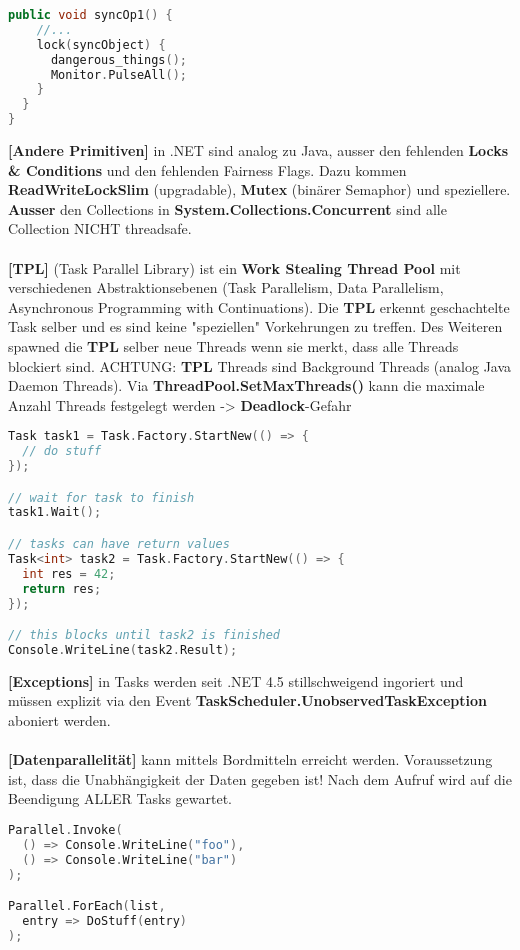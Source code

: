\documentclass[8pt]{extarticle}
\let\oldtextbf\textbf
\renewcommand{\textbf}{\tiny\oldtextbf}
\begin{document}
\begin{multicols*}{5}
\begin{lstlisting}[language=c++]
  public void syncOp1() {
    //...
    lock(syncObject) {
      dangerous_things();
      Monitor.PulseAll();
    }
  }
}
\end{lstlisting}
\textbf{[Andere Primitiven]} in .NET sind analog zu Java, ausser den fehlenden \textbf{Locks \& Conditions} und den fehlenden Fairness Flags. Dazu kommen \textbf{ReadWriteLockSlim} (upgradable), \textbf{Mutex} (binärer Semaphor) und speziellere. \textbf{Ausser} den Collections in \textbf{System.Collections.Concurrent} sind alle Collection NICHT threadsafe.\\\\
\textbf{[TPL]} (Task Parallel Library) ist ein \textbf{Work Stealing Thread Pool} mit verschiedenen Abstraktionsebenen (Task Parallelism, Data Parallelism, Asynchronous Programming with Continuations). Die \textbf{TPL} erkennt geschachtelte Task selber und es sind keine "speziellen" Vorkehrungen zu treffen. Des Weiteren spawned die \textbf{TPL} selber neue Threads wenn sie merkt, dass alle Threads blockiert sind. ACHTUNG: \textbf{TPL} Threads sind Background Threads (analog Java Daemon Threads). Via \textbf{ThreadPool.SetMaxThreads()} kann die maximale Anzahl Threads festgelegt werden -> \textbf{Deadlock}-Gefahr
\begin{lstlisting}[language=c++]
Task task1 = Task.Factory.StartNew(() => {
  // do stuff
});

// wait for task to finish
task1.Wait();

// tasks can have return values
Task<int> task2 = Task.Factory.StartNew(() => {
  int res = 42;
  return res;
});

// this blocks until task2 is finished
Console.WriteLine(task2.Result);
\end{lstlisting}
\textbf{[Exceptions]} in Tasks werden seit .NET 4.5 stillschweigend ingoriert und müssen explizit via den Event \textbf{TaskScheduler.UnobservedTaskException} aboniert werden.\\\\
\textbf{[Datenparallelität]} kann mittels Bordmitteln erreicht werden. Voraussetzung ist, dass die Unabhängigkeit der Daten gegeben ist! Nach dem Aufruf wird auf die Beendigung ALLER Tasks gewartet.
\begin{lstlisting}[language=c++]
Parallel.Invoke(
  () => Console.WriteLine("foo"),
  () => Console.WriteLine("bar")
);

Parallel.ForEach(list,
  entry => DoStuff(entry)
);


\end{lstlisting}
\end{multicols*}
\end{document}
